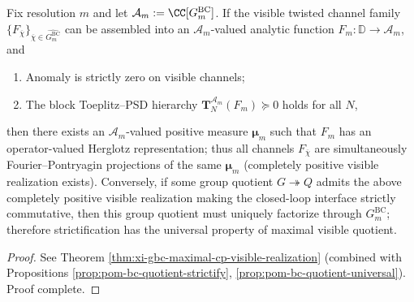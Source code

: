\begin{conclusion}\label{con:xi-terminal-strictification-maximal-cp-visible-quotient}
Fix resolution \(m\) and let \(\mathcal{A}_m:=\CC[G^{\mathrm{BC}}_m]\).
If the visible twisted channel family \(\{F_{\overline\chi}\}_{\overline\chi\in\widehat{G^{\mathrm{BC}}_m}}\) can be assembled into an \(\mathcal{A}_m\)-valued analytic function \(F_m:\mathbb{D}\to\mathcal{A}_m\), and
\begin{enumerate}
  \item Anomaly is strictly zero on visible channels;
  \item The block Toeplitz--PSD hierarchy \(\mathbf{T}^{\mathcal{A}_m}_N(F_m)\succeq 0\) holds for all \(N\),
\end{enumerate}
then there exists an \(\mathcal{A}_m\)-valued positive measure \(\boldsymbol\mu_m\) such that \(F_m\) has an operator-valued Herglotz representation;
thus all channels \(F_{\overline\chi}\) are simultaneously Fourier--Pontryagin projections of the same \(\boldsymbol\mu_m\) (completely positive visible realization exists).
Conversely, if some group quotient \(G\twoheadrightarrow Q\) admits the above completely positive visible realization making the closed-loop interface strictly commutative, then this group quotient must uniquely factorize through \(G^{\mathrm{BC}}_m\);
therefore strictification has the universal property of maximal visible quotient.
\end{conclusion}
\begin{proof}[Proof]
See Theorem \ref{thm:xi-gbc-maximal-cp-visible-realization} (combined with Propositions \ref{prop:pom-bc-quotient-strictify}, \ref{prop:pom-bc-quotient-universal}). Proof complete.
\end{proof}

